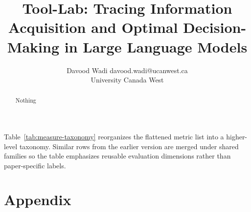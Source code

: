 \documentclass[10pt]{article} %
\title{Tool-Lab: Tracing Information Acquisition and Optimal Decision-Making in Large Language Models}
\author{\name Davood Wadi \email davood.wadi@ucanwest.ca \\
      \addr University Canada West
      }
\begin{document}
\maketitle

\begin{abstract}
Nothing
\end{abstract}










% 

\noindent Table~\ref{tab:measure-taxonomy} reorganizes the flattened metric list into a higher-level taxonomy. Similar rows from the earlier version are merged under shared families so the table emphasizes reusable evaluation dimensions rather than paper-specific labels.

\clearpage















\appendix
\section{Appendix}
\end{document}
